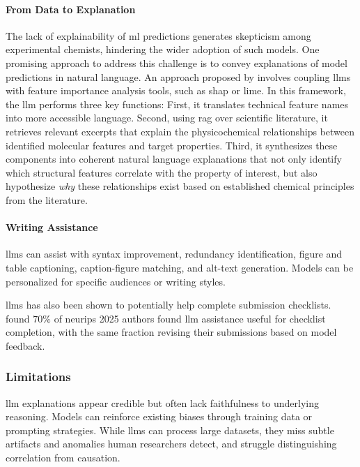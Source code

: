 \paragraph{From Data to Explanation} The lack of explainability of \gls{ml} predictions generates skepticism among experimental chemists\autocite{wellawatte2025human}, hindering the wider adoption of such models.\autocite{wellawatte2022model}
One promising approach to address this challenge is to convey explanations of model predictions in natural language. 
An approach proposed by \textcite{wellawatte2025human} involves coupling \glspl{llm} with feature importance analysis tools, such as \gls{shap} or \gls{lime}. 
In this framework, the \gls{llm} performs three key functions: First, it translates technical feature names into more accessible language. Second, using \gls{rag} over scientific literature, it retrieves relevant excerpts that explain the physicochemical relationships between identified molecular features and target properties. Third, it synthesizes these components into coherent natural language explanations that not only identify which structural features correlate with the property of interest, but also hypothesize \textit{why} these relationships exist based on established chemical principles from the literature. 

\paragraph{Writing Assistance} \glspl{llm} can assist with syntax improvement, redundancy identification,\autocite{khalifa2024using} figure and table captioning,\autocite{hsu2021scicap,selivanov2023medical} caption-figure matching,\autocite{hsu2023gpt04} and alt-text generation.\autocite{singh2024figura11y} Models can be personalized for specific audiences or writing styles.\autocite{li2023teach}

\glspl{llm} has also been shown to potentially help complete submission checklists. \textcite{goldberg2024usefulness} found $70\%$ of \gls{neurips} 2025 authors found \gls{llm} assistance useful for checklist completion, with the same fraction revising their submissions based on model feedback.

\subsubsection{Limitations}
\gls{llm} explanations appear credible but often lack faithfulness to underlying reasoning.\autocite{agarwal2024faithfulness} Models can reinforce existing biases through training data or prompting strategies.\autocite{kobak2025delving} While \glspl{llm} can process large datasets, they miss subtle artifacts and anomalies human researchers detect, and struggle distinguishing correlation from causation.\autocite{jin2023large}

